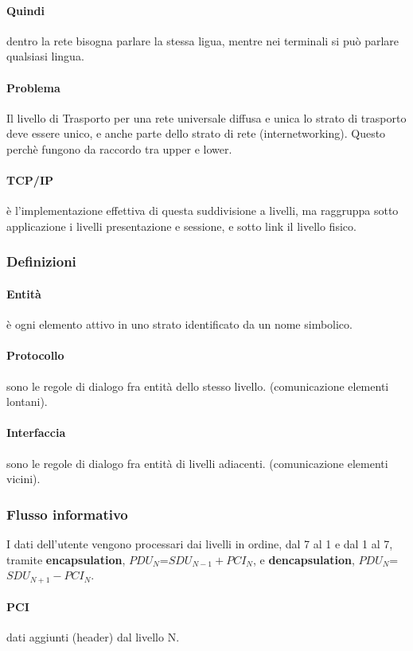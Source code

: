 \paragraph{Quindi} dentro la rete bisogna parlare la stessa ligua, mentre nei terminali si può parlare qualsiasi lingua.
\paragraph{Problema} Il livello di Trasporto per una rete universale diffusa e unica lo strato di trasporto deve essere unico, e anche parte dello strato di rete (internetworking). Questo perchè fungono da raccordo tra upper e lower.
\paragraph{TCP/IP} è l'implementazione effettiva di questa suddivisione a livelli, ma raggruppa sotto applicazione i livelli presentazione e sessione, e sotto link il livello fisico.
\subsubsection{Definizioni}
\paragraph{Entità} è ogni elemento attivo in uno strato identificato da un nome simbolico.
\paragraph{Protocollo} sono le regole di dialogo fra entità dello stesso livello. (comunicazione elementi lontani).
\paragraph{Interfaccia} sono le regole di dialogo fra entità di livelli adiacenti. (comunicazione elementi vicini).
\subsubsection{Flusso informativo}
I dati dell'utente vengono processari dai livelli in ordine, dal 7 al 1 e dal 1 al 7, tramite \textbf{encapsulation}, $PDU_N$=$SDU_{N-1}+PCI_N$, e \textbf{dencapsulation}, $PDU_{N}$=$SDU_{N+1}-PCI_N$.
\paragraph{PCI} dati aggiunti (header) dal livello N.

